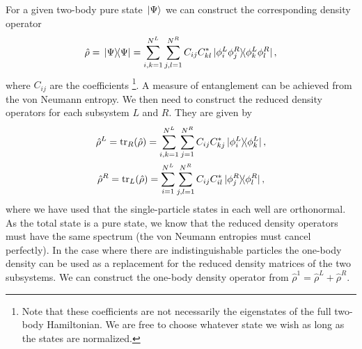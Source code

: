 \documentclass[twocolumn,superscriptaddress,unsortedaddress,
 amsmath,amssymb,
 aps,
]{revtex4-2}
\begin{document}
        For a given two-body pure state $\ket*{\Psi}$ we can construct the
        corresponding density operator
        \begin{align*}
            \hat{\rho} = \dyad*{\Psi}{\Psi}
            = \sum_{i, k = 1}^{N^L}
            \sum_{j, l = 1}^{N^R}
            C_{ij} C^{*}_{kl} \dyad*{\phi^L_i \phi^R_j}{
                \phi^L_k \phi^R_l
            },
        \end{align*}
        where $C_{ij}$ are the coefficients \footnote{
            Note that these coefficients are not necessarily the eigenstates
            of the full two-body Hamiltonian.
            We are free to choose whatever state we wish as long as the states
            are normalized.
        }.
        A measure of entanglement can be achieved from the von Neumann entropy.
        We then need to construct the reduced density operators for each
        subsystem $L$ and $R$.
        They are given by
        \begin{gather*}
            \hat{\rho}^L
            = \tr_R \! \qty(\hat{\rho})
            = \sum_{i, k = 1}^{N^L} \sum_{j = 1}^{N^R}
            C_{ij} C^{*}_{kj} \dyad*{\phi^L_i}{\phi^L_k},
            \\
            \hat{\rho}^R
            = \tr_{L} \! \qty(\hat{\rho})
            = \sum_{i = 1}^{N^L} \sum_{j, l = 1}^{N^R}
            C_{ij} C^{*}_{il} \dyad*{\phi^R_j}{\phi^R_l},
        \end{gather*}
        where we have used that the single-particle states in each well are
        orthonormal.
        As the total state is a pure state, we know that the reduced density
        operators must have the same spectrum (the von Neumann entropies must
        cancel perfectly).
        In the case where there are indistinguishable particles the one-body
        density can be used as a replacement for the reduced density matrices
        of the two subsystems.
        We can construct the one-body density operator from $\hat{\rho}^1
        = \hat{\rho}^L + \hat{\rho}^R$.
\end{document}
